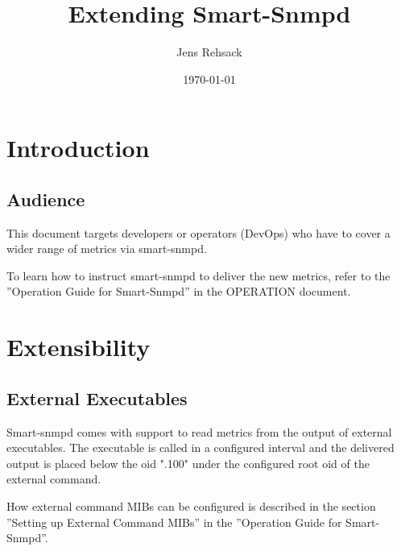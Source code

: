 \usepackage{hyperref}
\usepackage{longtable,tabularx,threeparttable}
\usepackage[dvipsnames,svgnames,table,hyperref]{xcolor}
\usepackage{textcomp}
\usepackage{url,listings}
\usepackage{fancybox}




\title{Extending Smart-Snmpd}

\author{Jens Rehsack}

\date{\today{}}

\maketitle

\tableofcontents

\section{Introduction}

\subsection{Audience}

This document targets developers or operators (DevOps) who have to
cover a wider range of metrics via smart-snmpd.

To learn how to instruct smart-snmpd to deliver the new metrics,
refer to the ''Operation Guide for Smart-Snmpd'' in the OPERATION
document.

\section{Extensibility}

\subsection{External Executables}

Smart-snmpd comes with support to read metrics from the output of external
executables. The executable is called in a configured interval and the
delivered output is placed below the oid ".100" under the configured
root oid of the external command.

How external command MIBs can be configured is described in the section
''Setting up External Command MIBs'' in the ''Operation Guide for
Smart-Snmpd''.

